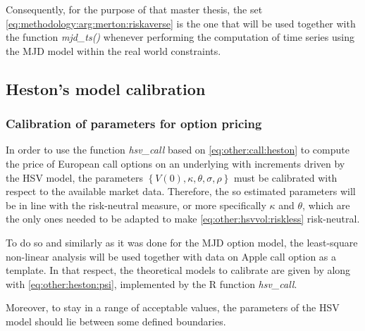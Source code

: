 \documentclass[12pt]{report}
\begin{document}
Consequently, for the purpose of that master thesis, the set \ref{eq:methodology:arg:merton:riskaverse} is the one that will be used together with the function \textit{mjd\_ts()} whenever performing the computation of time series using the MJD model within the real world constraints.











%
%
%
%
%
%


\subsection{Heston's model calibration}
\label{sub:methodology:calibration:heston}

\subsubsection*{Calibration of parameters for option pricing}

In order to use the function \textit{hsv\_call} based on \cref{eq:other:call:heston} to compute the price of European call options on an underlying with increments driven by the HSV model, the parameters $\left\{ V(0), \kappa, \theta, \sigma, \rho \right\}$ must be calibrated with respect to the available market data.
Therefore, the so estimated parameters will be in line with the risk-neutral measure, or more specifically $\kappa$ and $\theta$, which are the only ones needed to be adapted to make \cref{eq:other:hsvvol:riskless} risk-neutral.

To do so and similarly as it was done for the MJD option model, the least-square non-linear analysis will be used together with data on Apple call option as a template.
In that respect, the theoretical models to calibrate are given by  along with \cref{eq:other:heston:psi}, implemented by the R function \textit{hsv\_call}.

Moreover, to stay in a range of acceptable values, the parameters of the HSV model should lie between some defined boundaries. 
\end{document}
